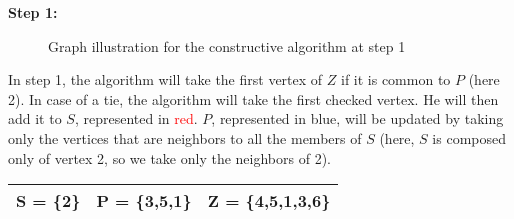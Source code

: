 \begin{minipage}{\linewidth}
    \textbf{Step 1:}

    \begin{minipage}{0.4\textwidth}
        \begin{figure}[H]
            \centering
            \caption{Graph illustration for the constructive algorithm at step 1}
            \label{fig:constructive-mewc-maxedge-step1}
        \end{figure}
    \end{minipage}
    \hspace{0.04\linewidth}
    \begin{minipage}{0.55\textwidth}
        In step 1, the algorithm will take the first vertex of $Z$ if it is common to $P$ (here 2). In case of a tie, the algorithm will take the first checked vertex. He will then add it to $S$, represented in \textcolor{red}{red}. $P$, represented in \textcolor{Cerulean}{blue}, will be updated by taking only the vertices that are neighbors to all the members of $S$ (here, $S$ is composed only of vertex 2, so we take only the neighbors of 2).

        \begin{center}
            \begin{tabular}{|lll|}
                \hline
                S = \{2\} & P = \{3,5,1\} & Z = \{4,5,1,3,6\} \\
                \hline
            \end{tabular}
        \end{center}
    \end{minipage}
\end{minipage}

